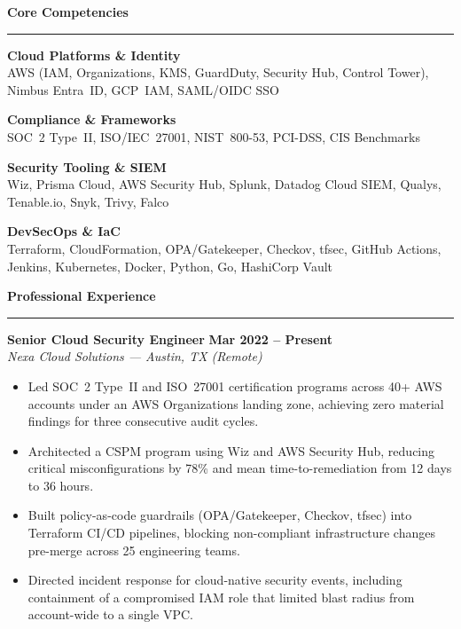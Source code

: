 \documentclass[10pt,letterpaper]{article}
\newcommand{\sechead}[1]{%
  \vspace{1pt}
  {\color{navy}\large\bfseries #1}\par
  \vspace{-7pt}
  {\color{accent}\rule{\linewidth}{1.1pt}}\par
  \vspace{1pt}
}
\newcommand{\role}[4]{%
  \textbf{#1} \hfill \textbf{\small #3}\\
  {\color{accent}\itshape #2} \hfill {\small\itshape #4}\\[2pt]
}
\begin{document}
\sechead{Core Competencies}
\begin{minipage}[t]{0.485\linewidth}
\begin{tcolorbox}[colback=accentlight,colframe=accent,boxrule=0.5pt,arc=2pt,
  left=6pt,right=6pt,top=5pt,bottom=5pt,boxsep=1pt]
\small
\textbf{\color{navy}Cloud Platforms \& Identity}\\
AWS (IAM, Organizations, KMS, GuardDuty, Security Hub, Control Tower), Nimbus Entra~ID,
GCP~IAM, SAML/OIDC SSO

\vspace{5pt}
\textbf{\color{navy}Compliance \& Frameworks}\\
SOC~2 Type~II, ISO/IEC~27001, NIST~800-53, PCI-DSS, CIS Benchmarks
\end{tcolorbox}
\end{minipage}
\hfill
\begin{minipage}[t]{0.485\linewidth}
\begin{tcolorbox}[colback=accentlight,colframe=accent,boxrule=0.5pt,arc=2pt,
  left=6pt,right=6pt,top=5pt,bottom=5pt,boxsep=1pt]
\small
\textbf{\color{navy}Security Tooling \& SIEM}\\
Wiz, Prisma Cloud, AWS Security Hub, Splunk, Datadog Cloud SIEM, Qualys, Tenable.io, Snyk, Trivy, Falco

\vspace{5pt}
\textbf{\color{navy}DevSecOps \& IaC}\\
Terraform, CloudFormation, OPA/Gatekeeper, Checkov, tfsec, GitHub Actions, Jenkins, Kubernetes,
Docker, Python, Go, HashiCorp Vault
\end{tcolorbox}
\end{minipage}
\par

\sechead{Professional Experience}

\role{Senior Cloud Security Engineer}{Nexa Cloud Solutions --- Austin, TX (Remote)}{Mar 2022 -- Present}{}
\begin{itemize}[leftmargin=14pt,itemsep=1pt,topsep=2pt,parsep=0pt]
  \small
  \item Led SOC~2 Type~II and ISO~27001 certification programs across 40+ AWS accounts under an
    AWS Organizations landing zone, achieving zero material findings for three consecutive audit cycles.
  \item Architected a CSPM program using Wiz and AWS Security Hub, reducing critical
    misconfigurations by 78\% and mean time-to-remediation from 12 days to 36 hours.
  \item Built policy-as-code guardrails (OPA/Gatekeeper, Checkov, tfsec) into Terraform CI/CD
    pipelines, blocking non-compliant infrastructure changes pre-merge across 25 engineering teams.
  \item Directed incident response for cloud-native security events, including containment of a
    compromised IAM role that limited blast radius from account-wide to a single VPC.
\end{itemize}
\end{document}
